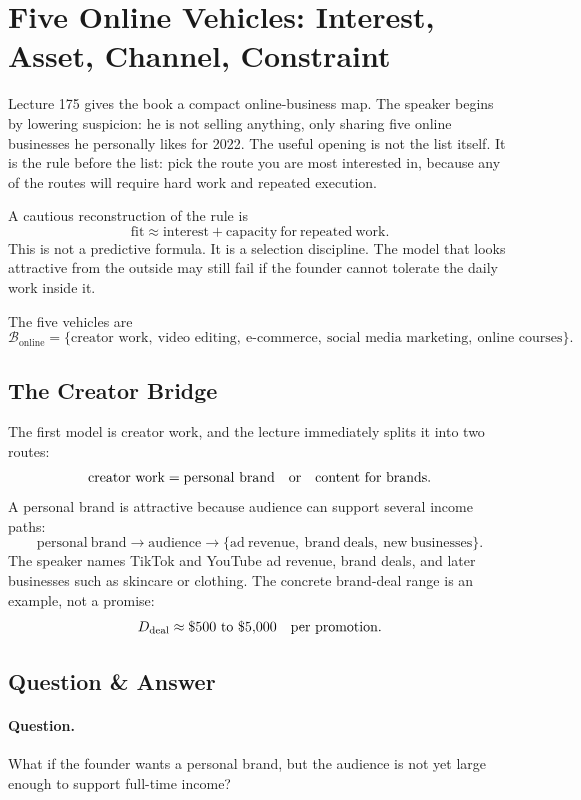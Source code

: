 \documentclass[11pt,oneside]{book}
\begin{document}
\section{Five Online Vehicles: Interest, Asset, Channel, Constraint}

Lecture 175 gives the book a compact online-business map. The speaker begins by lowering suspicion: he is not selling anything, only sharing five online businesses he personally likes for 2022. The useful opening is not the list itself. It is the rule before the list: pick the route you are most interested in, because any of the routes will require hard work and repeated execution.

A cautious reconstruction of the rule is
\[
\mathrm{fit}
\approx
\mathrm{interest}
+
\mathrm{capacity\ for\ repeated\ work}.
\]
This is not a predictive formula. It is a selection discipline. The model that looks attractive from the outside may still fail if the founder cannot tolerate the daily work inside it.

The five vehicles are
\[
\mathcal{B}_{\mathrm{online}}
=
\{\text{creator work},\ \text{video editing},\ \text{e-commerce},\ \text{social media marketing},\ \text{online courses}\}.
\]

\subsection{The Creator Bridge}

The first model is creator work, and the lecture immediately splits it into two routes:
\[
\mathrm{creator\ work}
=
\mathrm{personal\ brand}
\quad \hbox{or} \quad
\mathrm{content\ for\ brands}.
\]
A personal brand is attractive because audience can support several income paths:
\[
\mathrm{personal\ brand}
\longrightarrow
\mathrm{audience}
\longrightarrow
\{\mathrm{ad\ revenue},\ \mathrm{brand\ deals},\ \mathrm{new\ businesses}\}.
\]
The speaker names TikTok and YouTube ad revenue, brand deals, and later businesses such as skincare or clothing. The concrete brand-deal range is an example, not a promise:
\[
D_{\mathrm{deal}}
\approx
\$500 \hbox{ to } \$5{,}000
\quad \hbox{per promotion}.
\]

\subsection{Question \& Answer}

\paragraph{Question.}
What if the founder wants a personal brand, but the audience is not yet large enough to support full-time income?
\end{document}
